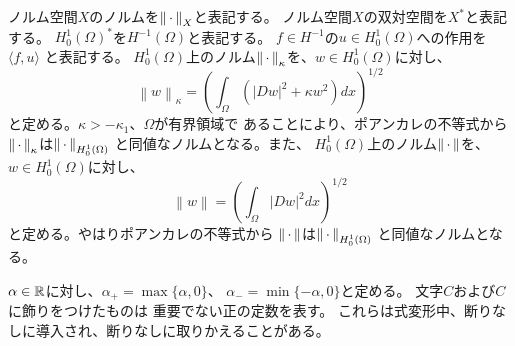 ノルム空間$X$のノルムを$\left\|\, \cdot \, \right\|_X$と表記する。
ノルム空間$X$の双対空間を$X^*$と表記する。
$H_0^1(\Omega)^*$を$H^{-1}(\Omega)$と表記する。
$f \in H^{-1}$の$u \in H_0^1(\Omega)$への作用を$\langle f, u \rangle$
と表記する。
$H_0^1(\Omega)$上のノルム$\left\|\, \cdot \, \right\|_{\kappa}$を、$w \in H_0^1(\Omega)$に対し、
\[
 \left\| w \right\|_\kappa = \left(\int_\Omega \left( \lvert Dw \rvert^2 +
 \kappa w ^2 \right) dx\right)^{1/2}
\]
と定める。$\kappa > -\kappa_1$、$\Omega$が有界領域で
あることにより、ポアンカレの不等式から
$\left\|\, \cdot \, \right\|_\kappa$は$\left\|\, \cdot \, \right\|_{H_0^1(\Omega)}$
と同値なノルムとなる。また、
$H_0^1(\Omega)$上のノルム$\left\|\, \cdot \, \right\|$を、$w \in H_0^1(\Omega)$に対し、
\[
 \left\| w \right\| = \left(\int_\Omega \lvert Dw \rvert^2 dx\right)^{1/2}
\]
と定める。やはりポアンカレの不等式から
$\left\|\, \cdot \, \right\|$は$\left\|\, \cdot \, \right\|_{H_0^1(\Omega)}$
と同値なノルムとなる。

$\alpha \in \mathbb{R}$に対し、$\alpha_+ = \max \{ \alpha, 0 \}$、
$\alpha_- = \min \{ -\alpha, 0 \}$と定める。
文字$C$および$C$に飾りをつけたものは
重要でない正の定数を表す。
これらは式変形中、断りなしに導入され、断りなしに取りかえることがある。

